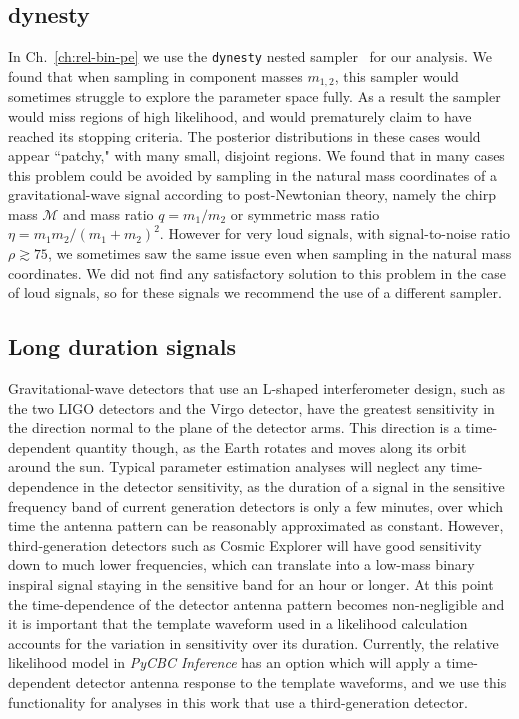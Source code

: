 \subsection{dynesty}
In Ch.~\ref{ch:rel-bin-pe} we use the \texttt{dynesty} nested sampler~\cite{Speagle_2020} for our analysis. We found that when sampling in component masses $m_{1,2}$, this sampler would sometimes struggle to explore the parameter space fully. As a result the sampler would miss regions of high likelihood, and would prematurely claim to have reached its stopping criteria. The posterior distributions in these cases would appear ``patchy," with many small, disjoint regions. We found that in many cases this problem could be avoided by sampling in the natural mass coordinates of a gravitational-wave signal according to post-Newtonian theory, namely the chirp mass $\mathcal{M}$ and mass ratio $q=m_1/m_2$ or symmetric mass ratio $\eta=m_{1}m_{2}/(m_{1}+m_{2})^2$. However for very loud signals, with signal-to-noise ratio $\rho \gtrsim 75$, we sometimes saw the same issue even when sampling in the natural mass coordinates. We did not find any satisfactory solution to this problem in the case of loud signals, so for these signals we recommend the use of a different sampler.

\subsection{Long duration signals}
Gravitational-wave detectors that use an L-shaped interferometer design, such as the two LIGO detectors and the Virgo detector, have the greatest sensitivity in the direction normal to the plane of the detector arms. This direction is a time-dependent quantity though, as the Earth rotates and moves along its orbit around the sun. Typical parameter estimation analyses will neglect any time-dependence in the detector sensitivity, as the duration of a signal in the sensitive frequency band of current generation detectors is only a few minutes, over which time the antenna pattern can be reasonably approximated as constant. However, third-generation detectors such as Cosmic Explorer will have good sensitivity down to much lower frequencies, which can translate into a low-mass binary inspiral signal staying in the sensitive band for an hour or longer. At this point the time-dependence of the detector antenna pattern becomes non-negligible and it is important that the template waveform used in a likelihood calculation accounts for the variation in sensitivity over its duration. Currently, the relative likelihood model in \textit{PyCBC Inference} has an option which will apply a time-dependent detector antenna response to the template waveforms, and we use this functionality for analyses in this work that use a third-generation detector.

